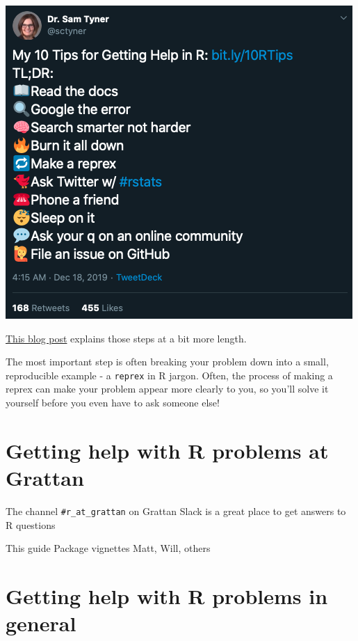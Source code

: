 \documentclass[
]{book}
\begin{document}
\href{https://mobile.twitter.com/sctyner/status/1206986161434058752}{\includegraphics{atlas/getting_help_tweet.png}}

\href{https://sctyner.github.io/rhelp.html}{This blog post} explains those steps at a bit more length.

The most important step is often breaking your problem down into a small, reproducible example - a \texttt{reprex} in R jargon. Often, the process of making a reprex can make your problem appear more clearly to you, so you'll solve it yourself before you even have to ask someone else!

\hypertarget{getting-help-with-r-problems-at-grattan}{%
\section{Getting help with R problems at Grattan}\label{getting-help-with-r-problems-at-grattan}}

The channel \texttt{\#r\_at\_grattan} on Grattan Slack is a great place to get answers to R questions

This guide
Package vignettes
Matt, Will, others

\hypertarget{getting-help-with-r-problems-in-general}{%
\section{Getting help with R problems in general}\label{getting-help-with-r-problems-in-general}}
\end{document}
